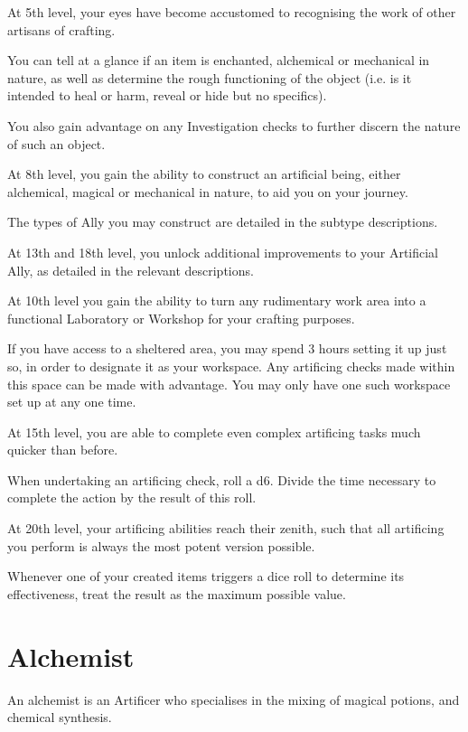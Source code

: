 {
	At 5th level, your eyes have become accustomed to recognising the work of other artisans of crafting. 
	
	You can tell at a glance if an item is enchanted, alchemical or mechanical in nature, as well as determine the rough functioning of the object (i.e. is it intended to heal or harm, reveal or hide \minus{} but no specifics). 
	
	You also gain advantage on any Investigation checks to further discern the nature of such an object.  
}

{
	At 8th level, you gain the ability to construct an artificial being, either alchemical, magical or mechanical in nature, to aid you on your journey. 
	
	The types of Ally you may construct are detailed in the subtype descriptions. 
	
	At 13th and 18th level, you unlock additional improvements to your Artificial Ally, as detailed in the relevant descriptions. 
}

{
	At 10th level you gain the ability to turn any rudimentary work area into a functional Laboratory or Workshop for your crafting purposes. 
	
	If you have access to a sheltered area, you may spend 3 hours setting it up just so, in order to designate it as your workspace. Any artificing checks made within this space can be made with advantage. You may only have one such workspace set up at any one time. 
}

{
	At 15th level, you are able to complete even complex artificing tasks much quicker than before. 
	
	When undertaking an artificing check, roll a d6. Divide the time necessary to complete the action by the result of this roll. 
}

{
	At 20th level, your artificing abilities reach their zenith, such that all artificing you perform is always the most potent version possible. 
	
	Whenever one of your created items triggers a dice roll to determine its effectiveness, treat the result as the maximum possible value. 
}

\section*{Alchemist}

An alchemist is an Artificer who specialises in the mixing of magical potions, and chemical synthesis. 

